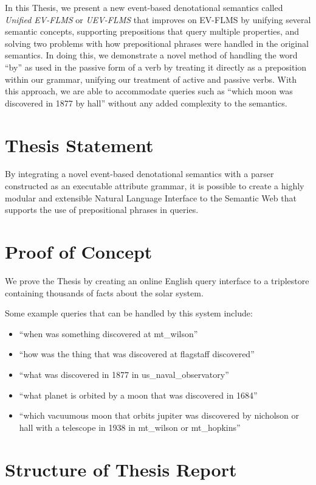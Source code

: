 \documentclass[../main.tex]{subfiles}
\begin{document}
In this Thesis, we present a new event-based denotational semantics called {\em Unified EV-FLMS} or {\em UEV-FLMS} that improves on EV-FLMS by unifying several semantic concepts,
supporting prepositions that query multiple properties, and solving two problems with how prepositional phrases were handled in the original semantics.
In doing this, we demonstrate a novel method of handling the word ``by'' as used in the passive form of a verb by treating it directly as a preposition within our grammar, unifying our treatment of active and passive verbs.  With this approach, we are able to accommodate queries such as ``which moon was discovered in 1877 by hall'' without any added complexity to the semantics.

\section{Thesis Statement}
By integrating a novel event-based denotational semantics with a parser constructed as an executable attribute grammar, it is possible to create a highly modular and extensible Natural Language Interface to the Semantic Web that supports the use of prepositional phrases in queries.

\section{Proof of Concept} We prove the Thesis by creating an online English query interface to a triplestore containing thousands of facts about the solar system\cite{Solarman:2016}.

Some example queries that can be handled by this system include:

\begin{itemize}
	\item ``when was something discovered at mt\_wilson''
	\item ``how was the thing that was discovered at flagstaff discovered''
	\item ``what was discovered in 1877 in us\_naval\_observatory''
	\item ``what planet is orbited by a moon that was discovered in 1684''
	\item ``which vacuumous moon that orbits jupiter was discovered by nicholson or hall with a telescope in 1938 in mt\_wilson or mt\_hopkins''
\end{itemize}

\section{Structure of Thesis Report}
\end{document}
